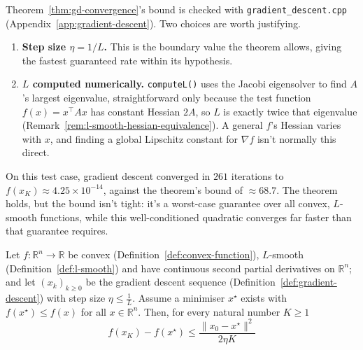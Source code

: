 		\begin{compremark}
			Theorem~\ref{thm:gd-convergence}'s bound is checked with \texttt{gradient\_descent.cpp} (Appendix~\ref{app:gradient-descent}). Two choices are worth justifying.
			
			\begin{enumerate}[label=\roman*.]
				\item \textbf{Step size $\eta=1/L$.} This is the boundary value the theorem allows, giving the fastest guaranteed rate within its hypothesis.
				\item \textbf{$L$ computed numerically.} \texttt{computeL()} uses the Jacobi eigensolver to find $A$'s largest eigenvalue, straightforward only because the test function $f(x)=x^\top Ax$ has constant Hessian $2A$, so $L$ is exactly twice that eigenvalue (Remark~\ref{rem:l-smooth-hessian-equivalence}). A general $f$'s Hessian varies with $x$, and finding a global Lipschitz constant for $\nabla f$ isn't normally this direct.
			\end{enumerate}
			
			On this test case, gradient descent converged in $261$ iterations to $f(x_K)\approx4.25\times10^{-14}$, against the theorem's bound of $\approx68.7$. The theorem holds, but the bound isn't tight: it's a worst-case guarantee over all convex, $L$-smooth functions, while this well-conditioned quadratic converges far faster than that guarantee requires.
		\end{compremark}
		
		\begin{theorem}
			\label{thm:gd-convergence}
			Let $f:\mathbb{R}^n \to \mathbb{R}$ be convex (Definition~\ref{def:convex-function}), $L$-smooth (Definition~\ref{def:l-smooth}) and have continuous second partial derivatives on $\mathbb{R}^n$; and let $(x_k)_{k\ge0}$ be the gradient descent sequence (Definition~\ref{def:gradient-descent}) with step size $\eta \le \frac{1}{L}$. Assume a minimiser $x^\star$ exists with $f(x^\star)\le f(x)$ for all $x\in\mathbb{R}^n$. Then, for every natural number $K \ge 1$
			\[
				f(x_K) - f(x^\star) \le \frac{\|x_0-x^\star\|^2}{2\eta K}
			\]
		\end{theorem}
		
